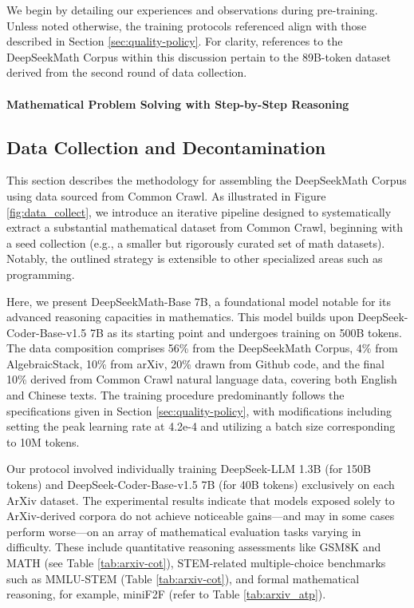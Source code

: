 We begin by detailing our experiences and observations during pre-training. Unless noted otherwise, the training protocols referenced align with those described in Section \ref{sec:quality-policy}. For clarity, references to the DeepSeekMath Corpus within this discussion pertain to the 89B-token dataset derived from the second round of data collection.

\paragraph{Mathematical Problem Solving with Step-by-Step Reasoning}

\subsection{Data Collection and Decontamination} This section describes the methodology for assembling the DeepSeekMath Corpus using data sourced from Common Crawl. As illustrated in Figure \ref{fig:data_collect}, we introduce an iterative pipeline designed to systematically extract a substantial mathematical dataset from Common Crawl, beginning with a seed collection (e.g., a smaller but rigorously curated set of math datasets). Notably, the outlined strategy is extensible to other specialized areas such as programming.

Here, we present DeepSeekMath-Base 7B, a foundational model notable for its advanced reasoning capacities in mathematics. This model builds upon DeepSeek-Coder-Base-v1.5 7B \citep{deepseek-coder} as its starting point and undergoes training on 500B tokens. The data composition comprises 56\% from the DeepSeekMath Corpus, 4\% from AlgebraicStack, 10\% from arXiv, 20\% drawn from Github code, and the final 10\% derived from Common Crawl natural language data, covering both English and Chinese texts. The training procedure predominantly follows the specifications given in Section \ref{sec:quality-policy}, with modifications including setting the peak learning rate at 4.2e-4 and utilizing a batch size corresponding to 10M tokens.

Our protocol involved individually training DeepSeek-LLM 1.3B (for 150B tokens) and DeepSeek-Coder-Base-v1.5 7B (for 40B tokens) exclusively on each ArXiv dataset. The experimental results indicate that models exposed solely to ArXiv-derived corpora do not achieve noticeable gains—and may in some cases perform worse—on an array of mathematical evaluation tasks varying in difficulty. These include quantitative reasoning assessments like GSM8K and MATH (see Table \ref{tab:arxiv-cot}), STEM-related multiple-choice benchmarks such as MMLU-STEM (Table \ref{tab:arxiv-cot}), and formal mathematical reasoning, for example, miniF2F (refer to Table \ref{tab:arxiv_atp}).

